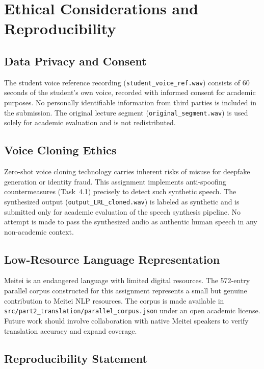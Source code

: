 \documentclass[11pt]{article}
\begin{document}
\section{Ethical Considerations and Reproducibility}

\subsection{Data Privacy and Consent}

The student voice reference recording (\texttt{student\_voice\_ref.wav})
consists of 60 seconds of the student's own voice, recorded with informed
consent for academic purposes. No personally identifiable information from
third parties is included in the submission. The original lecture segment
(\texttt{original\_segment.wav}) is used solely for academic evaluation
and is not redistributed.

\subsection{Voice Cloning Ethics}

Zero-shot voice cloning technology carries inherent risks of misuse for
deepfake generation or identity fraud. This assignment implements
anti-spoofing countermeasures (Task~4.1) precisely to detect such synthetic
speech. The synthesized output (\texttt{output\_LRL\_cloned.wav}) is
labeled as synthetic and is submitted only for academic evaluation of the
speech synthesis pipeline. No attempt is made to pass the synthesized audio
as authentic human speech in any non-academic context.

\subsection{Low-Resource Language Representation}

Meitei is an endangered language with limited digital resources.
The 572-entry parallel corpus constructed for this assignment represents a
small but genuine contribution to Meitei NLP resources. The corpus is made
available in \texttt{src/part2\_translation/parallel\_corpus.json} under an
open academic license. Future work should involve collaboration with native
Meitei speakers to verify translation accuracy and expand coverage.

\subsection{Reproducibility Statement}
\end{document}
